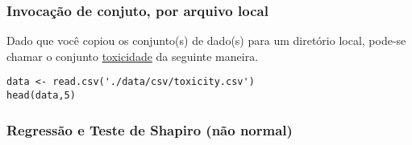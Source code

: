 \documentclass[11pt]{article}
\begin{document}
\subsubsection{Invocação de conjuto, por arquivo local}
\label{sec:orgb03f74d}

Dado que você copiou os conjunto(s) de dado(s) para um diretório
local, pode-se chamar o conjunto \href{https://drive.google.com/file/d/1dZE0wj0Z-FeXCvz-4ft0CPJ6Enn1fnew/view?usp=sharing}{toxicidade} da seguinte maneira.

\begin{verbatim}
data <- read.csv('./data/csv/toxicity.csv')
head(data,5)
\end{verbatim}

\subsubsection{Regressão e Teste de Shapiro (não normal)}
\label{sec:org55d95a2}
\end{document}
